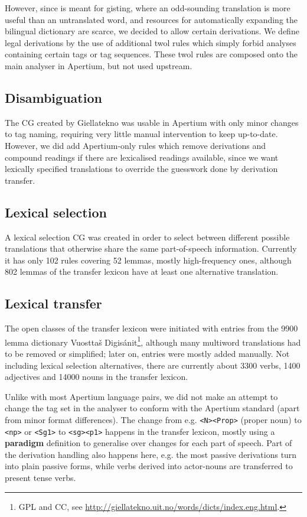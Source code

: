 However, since \smenob{} is meant for gisting, where an odd-sounding
translation is more useful than an untranslated word, and resources
for automatically expanding the bilingual dictionary are scarce, we
decided to allow certain derivations. We define legal derivations by
the use of additional twol rules which simply forbid analyses
containing certain tags or tag sequences. These twol rules are
composed onto the main analyser in Apertium, but not used upstream.

\subsection{Disambiguation}
The CG created by Giellatekno was usable in Apertium with only minor
changes to tag naming, requiring very little manual intervention to
keep up-to-date. However, we did add Apertium-only rules which remove
derivations and compound readings if there are lexicalised readings
available, since we want lexically specified translations to override
the guesswork done by derivation transfer.

\subsection{Lexical selection}
A lexical selection CG was created in order to select between
different possible translations that otherwise share the same
part-of-speech information. Currently it has only 102 rules covering
52 lemmas, mostly high-frequency ones, although 802 lemmas of the
transfer lexicon have at least one alternative translation.

\subsection{Lexical transfer}
The open classes of the transfer lexicon were initiated with entries
from the 9900 lemma dictionary Vuosttaš Digisánit\footnote{GPL and CC,
  see
  \href{http://giellatekno.uit.no/words/dicts/index.eng.html}{http://giellatekno.uit.no/words/dicts/index.eng.html}.},
although many multiword translations had to be removed or simplified;
later on, entries were mostly added manually. Not including lexical
selection alternatives, there are currently about 3300 verbs, 1400
adjectives and 14000 nouns in the transfer lexicon.

Unlike with most Apertium language pairs, we did not make an attempt
to change the tag set in the analyser to conform with the Apertium
standard (apart from minor format differences). The change from e.g.
\texttt{<N><Prop>} (proper noun) to \texttt{<np>} or \texttt{<Sg1>} to
\texttt{<sg><p1>} happens in the transfer lexicon, mostly using a
\textbf{paradigm} definition to generalise over changes for each part
of speech. Part of the derivation handling also happens here, e.g. the
most passive derivations turn into plain passive forms, while verbs
derived into actor-nouns are transferred to present tense verbs.

